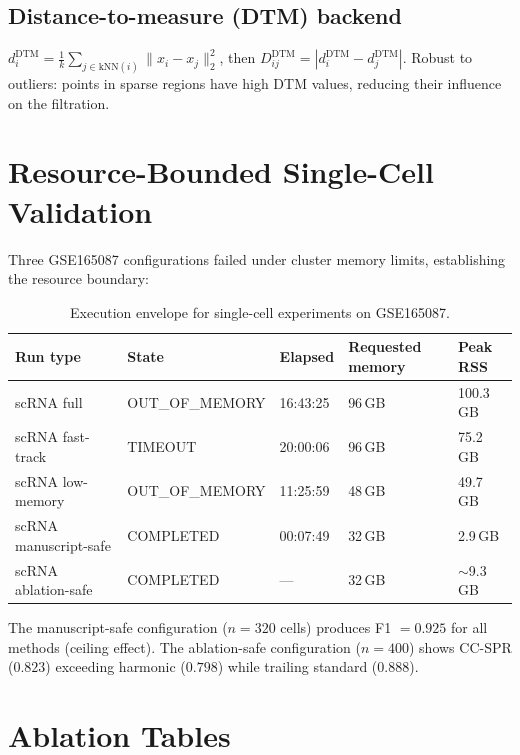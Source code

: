 \documentclass[11pt]{article}
\begin{document}
\subsection{Distance-to-measure (DTM) backend}
$d_i^{\text{DTM}} = \frac{1}{k}\sum_{j \in \text{kNN}(i)} \|x_i - x_j\|_2^2$, then
$D_{ij}^{\text{DTM}} = |d_i^{\text{DTM}} - d_j^{\text{DTM}}|$.
Robust to outliers: points in sparse regions have high DTM values, reducing their influence on the filtration.

\section{Resource-Bounded Single-Cell Validation}
\label{sec:supp_scrna}

Three GSE165087 configurations failed under cluster memory limits, establishing the resource boundary:

\begin{table}[h]
\centering
\small
\begin{tabular}{lllll}
\toprule
Run type & State & Elapsed & Requested memory & Peak RSS \\
\midrule
scRNA full & OUT\_OF\_MEMORY & 16:43:25 & 96\,GB & 100.3\,GB \\
scRNA fast-track & TIMEOUT & 20:00:06 & 96\,GB & 75.2\,GB \\
scRNA low-memory & OUT\_OF\_MEMORY & 11:25:59 & 48\,GB & 49.7\,GB \\
scRNA manuscript-safe & COMPLETED & 00:07:49 & 32\,GB & 2.9\,GB \\
scRNA ablation-safe & COMPLETED & --- & 32\,GB & ${\sim}$9.3\,GB \\
\bottomrule
\end{tabular}
\caption{Execution envelope for single-cell experiments on GSE165087.}
\label{tab:supp_scrna}
\end{table}

The manuscript-safe configuration ($n=320$ cells) produces F1 $= 0.925$ for all methods (ceiling effect).
The ablation-safe configuration ($n=400$) shows CC-SPR ($0.823$) exceeding harmonic ($0.798$) while trailing standard ($0.888$).

\section{Ablation Tables}
\label{sec:supp_ablation}
\end{document}
